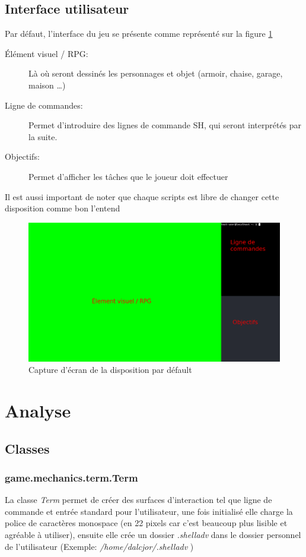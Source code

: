 \documentclass{report}
\begin{document}
\newpage

\section {Interface utilisateur}
Par défaut, l’interface du jeu se présente comme représenté sur la figure \ref{fig:screen1}
\begin{description}
  \item [Élément visuel / RPG:] Là où seront dessinés les personnages et objet (armoir, chaise, garage, maison …)
  \item [Ligne de commandes:] Permet d’introduire des lignes de commande SH, qui seront interprétés par la suite.
  \item [Objectifs:] Permet d’afficher les tâches que le joueur doit effectuer
\end{description}
\par Il est aussi important de noter que chaque scripts est libre de changer cette disposition comme bon
l'entend

\begin{figure}
  \includegraphics[width=\linewidth]{img/image1}
  \caption{Capture d'écran de la disposition par défault}
  \label{fig:screen1}
\end{figure}

\chapter{Analyse}
\section{Classes}
\subsection{game.mechanics.term.Term}
La classe \emph{Term} permet de créer des surfaces d'interaction tel que ligne de commande et entrée standard pour l’utilisateur, une fois initialisé elle charge la police de caractères monospace (en 22 pixels car c’est beaucoup plus lisible et agréable à utiliser), ensuite elle crée un dossier \emph{.shelladv} dans le dossier personnel de l’utilisateur (Exemple: \emph{/home/dalcjor/.shelladv} )
\end{document}
